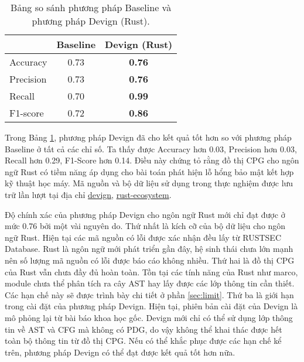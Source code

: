 \begin{table}[H]
    \centering
    \caption{Bảng so sánh phương pháp Baseline và phương pháp Devign (Rust).}
    \label{table:c4_ml}
    \begin{tabular}{l @{\hskip 3cm} c @{\hskip 3cm} c}
        \hline
         & Baseline & \textbf{Devign (Rust)} \\
        \hline
        Accuracy & 0.73 & \textbf{0.76} \\
        Precision & 0.73 & \textbf{0.76} \\
        Recall & 0.70 & \textbf{0.99} \\
        F1-score & 0.72 & \textbf{0.86} \\
        \hline
    \end{tabular}
\end{table}

Trong Bảng \ref{table:c4_ml}, phương pháp Devign đã cho kết quả tốt hơn so với phương pháp Baseline ở tất cả các chỉ số.
Ta thấy được Accuracy hơn 0.03, Precision hơn 0.03, Recall hơn 0.29, F1-Score hơn 0.14.
Điều này chứng tỏ rằng đồ thị CPG cho ngôn ngữ Rust có tiềm năng áp dụng cho bài toán phát hiện lỗ hổng bảo mật kết hợp kỹ thuật học máy.
Mã nguồn và bộ dữ liệu sử dụng trong thực nghiệm được lưu trữ lần lượt tại địa chỉ \href{https://github.com/congnghiahieu/devign}{devign}, \href{https://github.com/congnghiahieu/rust-ecosystem}{rust-ecosystem}.

Độ chính xác của phương pháp Devign cho ngôn ngữ Rust mới chỉ đạt được ở mức 0.76 bởi một vài nguyên do.
Thứ nhất là kích cỡ của bộ dữ liệu cho ngôn ngữ Rust.
Hiện tại các mã nguồn có lỗi được xác nhận đều lấy từ RUSTSEC Database.
Rust là ngôn ngữ mới phát triển gần đây, hệ sinh thái chưa lớn mạnh nên số lượng mã nguồn có lỗi được báo cáo không nhiều.
Thứ hai là đồ thị CPG của Rust vẫn chưa đầy đủ hoàn toàn.
Tồn tại các tính năng của Rust như marco, module chưa thể phân tích ra cây AST hay lấy được các lớp thông tin cần thiết.
Các hạn chế này sẽ được trình bày chi tiết ở phần \ref{sec:limit}.
Thứ ba là giới hạn trong cài đặt của phương pháp Devign.
Hiện tại, phiên bản cài đặt của Devign là mô phỏng lại từ bài báo khoa học gốc.
Devign mới chỉ có thể sử dụng lớp thông tin về AST và CFG mà không có PDG, do vậy không thể khai thác được hết toàn bộ thông tin từ đồ thị CPG.
Nếu có thể khắc phục được các hạn chế kể trên, phương pháp Devign có thể đạt được kết quả tốt hơn nữa.

